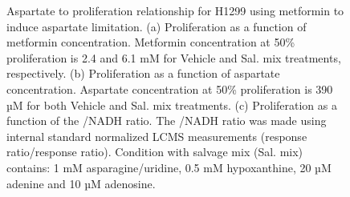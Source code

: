 \begin{figure}[ht]
\begin{subfigure}[b]{0.49\textwidth}
         \caption{}
         \label{fig:app_ch2:H1299_Met_NAD_vs_prlfr}
     \end{subfigure}
        \caption[H1299 metformin titration aspartate to proliferation.]{
        Aspartate to proliferation relationship for H1299 using metformin to induce aspartate limitation.
        (a) Proliferation as a function of metformin concentration.
        Metformin concentration at 50\% proliferation is 2.4 and 6.1 mM for Vehicle and Sal. mix treatments, respectively.
        (b) Proliferation as a function of aspartate concentration.
        Aspartate concentration at 50\% proliferation is 390 µM for both Vehicle and Sal. mix treatments.
        (c) Proliferation as a function of the \NAD{}/NADH ratio.
        The \NAD{}/NADH ratio was made using internal standard normalized LCMS measurements (response ratio/response ratio).
        Condition with salvage mix (Sal. mix) contains: 1 mM asparagine/uridine, 0.5 mM hypoxanthine, 20 µM adenine and 10 µM adenosine.
        }
        \label{fig:app_ch2:H1299_asp_prlfr_met}
\end{figure}

